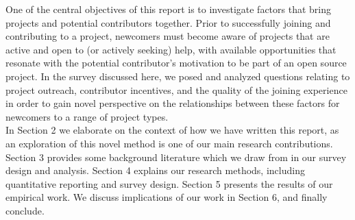 One of the central objectives of this report is to investigate factors that bring projects and potential contributors together. Prior to successfully joining and contributing to a project, newcomers must become aware of projects that are active and open to (or actively seeking) help, with available opportunities that resonate with the potential contributor's motivation to be part of an open source project. In the survey discussed here, we posed and analyzed questions relating to project outreach, contributor incentives, and the quality of the joining experience in order to gain novel perspective on the relationships between these factors for newcomers to a range of project types.\\

\noindent In Section 2 we elaborate on the context of how we have written this report, as an exploration of this novel method is one of our main research contributions.
Section 3 provides some background literature which we draw from in
our survey design and analysis.
Section 4 explains our research methods, including quantitative
reporting and survey design.
Section 5 presents the results of our empirical work.
We discuss implications of our work in Section 6, and finally conclude. 


